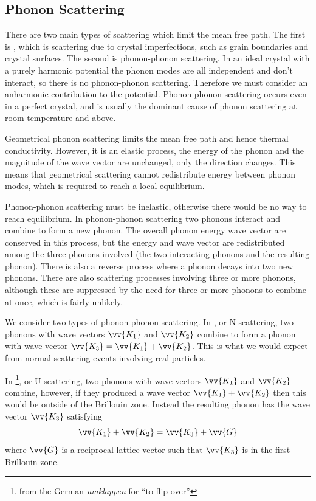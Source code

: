 \documentclass[fleqn]{NotesClass}
\begin{document}
    \subsection{Phonon Scattering}
    There are two main types of scattering which limit the mean free path.
    The first is , which is scattering due to crystal imperfections, such as grain boundaries and crystal surfaces.
    The second is phonon-phonon scattering.
    In an ideal crystal with a purely harmonic potential the phonon modes are all independent and don't interact, so there is no phonon-phonon scattering.
    Therefore we must consider an anharmonic contribution to the potential.
    Phonon-phonon scattering occurs even in a perfect crystal, and is usually the dominant cause of phonon scattering at room temperature and above.
    
    Geometrical phonon scattering limits the mean free path and hence thermal conductivity.
    However, it is an elastic process, the energy of the phonon and the magnitude of the wave vector are unchanged, only the direction changes.
    This means that geometrical scattering cannot redistribute energy between phonon modes, which is required to reach a local equilibrium.
    
    Phonon-phonon scattering must be inelastic, otherwise there would be no way to reach equilibrium.
    In phonon-phonon scattering two phonons interact and combine to form a new phonon.
    The overall phonon energy wave vector are conserved in this process, but the energy and wave vector are redistributed among the three phonons involved (the two interacting phonons and the resulting phonon).
    There is also a reverse process where a phonon decays into two new phonons.
    There are also scattering processes involving three or more phonons, although these are suppressed by the need for three or more phonons to combine at once, which is fairly unlikely.
    
    We consider two types of phonon-phonon scattering.
    In , or N-scattering, two phonons with wave vectors \(\vv{K_1}\) and \(\vv{K_2}\) combine to form a phonon with wave vector \(\vv{K_3} = \vv{K_1} + \vv{K_2}\).
    This is what we would expect from normal scattering events involving real particles.
    
    In \footnote{from the German \textit{umklappen} for \enquote{to flip over}}, or U-scattering, two phonons with wave vectors \(\vv{K_1}\) and \(\vv{K_2}\) combine, however, if they produced a wave vector \(\vv{K_1} + \vv{K_2}\) then this would be outside of the Brillouin zone.
    Instead the resulting phonon has the wave vector \(\vv{K_3}\) satisfying
    \begin{equation}
        \vv{K_1} + \vv{K_2} = \vv{K_3} + \vv{G}
    \end{equation}
    where \(\vv{G}\) is a reciprocal lattice vector such that \(\vv{K_3}\) is in the first Brillouin zone.
    
\end{document}
